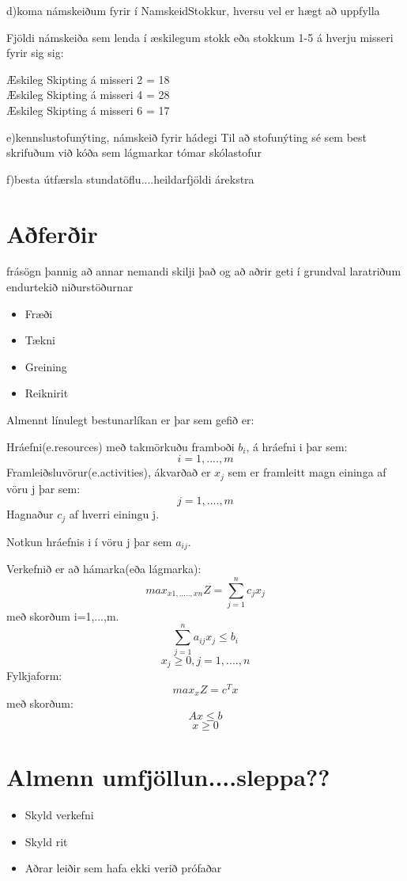 \documentclass[a4paper,12pt]{article}
\begin{document}
d)koma námskeiðum fyrir í NamskeidStokkur, hversu vel er hægt að uppfylla

Fjöldi námskeiða sem lenda í æskilegum stokk eða stokkum 1-5 á hverju misseri fyrir sig sig:

Æskileg Skipting á misseri 2 = 18\\
Æskileg Skipting á misseri 4 = 28\\
Æskileg Skipting á misseri 6 = 17

e)kennslustofunýting, námskeið fyrir hádegi
Til að stofunýting sé sem best skrifuðum við kóða sem lágmarkar tómar skólastofur

f)besta útfærsla stundatöflu....heildarfjöldi árekstra

\section{Aðferðir}
frásögn þannig að annar nemandi skilji það og að aðrir geti í
grundval laratriðum endurtekið niðurstöðurnar
\begin{itemize}
\item Fræði
\item Tækni
\item Greining
\item Reiknirit
\end{itemize}


Almennt línulegt bestunarlíkan er þar sem gefið er:

Hráefni(e.resources) með takmörkuðu framboði $b_i$, á hráefni i þar sem:
\[i=1,....,m\]
Framleiðsluvörur(e.activities), ákvarðað er $x_j$ sem er framleitt magn eininga af vöru j þar sem:
\[j=1,....,m\]
Hagnaður $c_j$ af hverri einingu j. 

Notkun hráefnis i í vöru j þar sem $a_{ij}$.

Verkefnið er að hámarka(eða lágmarka):
\[max_{x1,.....,xn}Z = \sum_{j=1}^{n}c_j x_j\]
með skorðum i=1,...,m.
\[\sum_{j=1}^{n}a_{ij} x_j\leq b_i\]
\[x_j\geq 0, j=1,....,n\]
Fylkjaform:
\[max_xZ=c^Tx\]
með skorðum:
\[Ax\leq b\]
\[x\geq 0\]

\section{Almenn umfjöllun....sleppa??}
\begin{itemize}
\item Skyld verkefni
\item Skyld rit
\item Aðrar leiðir sem hafa ekki verið prófaðar
\end{itemize}
\end{document}
